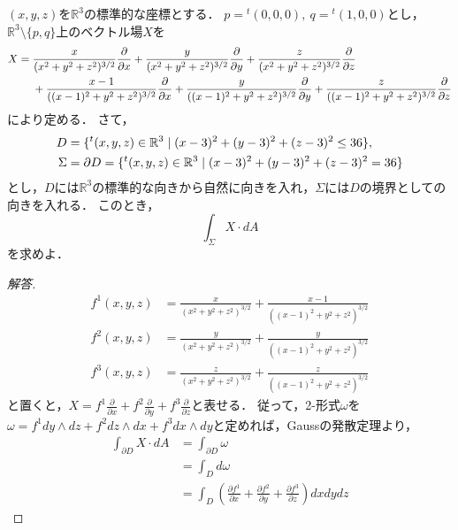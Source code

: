 \documentclass[uplatex, dvipdfmx]{jsreport}
\begin{document}
\begin{example}
    \begin{question*}
        $(x,y,z)$を$\mathbb{R}^3$の標準的な座標とする．
        $p={}^t(0,0,0),\ q={}^t(1,0,0)$とし，$\mathbb{R}^3\setminus\{p,q\}$上のベクトル場$X$を
        \begin{align*}
        X&=\frac{x}{(x^2+y^2+z^2)^{3/2}}\frac{\partial}{\partial x}+\frac{y}{(x^2+y^2+z^2)^{3/2}}\frac{\partial}{\partial y}+\frac{z}{(x^2+y^2+z^2)^{3/2}}\frac{\partial}{\partial z}\\*
        &\hphantom{{}={}}+\frac{x-1}{((x-1)^2+y^2+z^2)^{3/2}}\frac{\partial}{\partial x}+\frac{y}{((x-1)^2+y^2+z^2)^{3/2}}\frac{\partial}{\partial y}+\frac{z}{((x-1)^2+y^2+z^2)^{3/2}}\frac{\partial}{\partial z}
        \end{align*}
        により定める．
        さて，
        \begin{align*}
        D&=\{{}^t(x,y,z)\in\mathbb{R}^3\mid(x-3)^2+(y-3)^2+(z-3)^2\leq36\},\\*
        \Sigma&=\partial D=\{{}^t(x,y,z)\in\mathbb{R}^3\mid(x-3)^2+(y-3)^2+(z-3)^2=36\}
        \end{align*}とし，$D$には$\mathbb{R}^3$の標準的な向きから自然に向きを入れ，$\Sigma$には$D$の境界としての向きを入れる．
        このとき，
        \[ \int_{\Sigma}X\cdot dA \]
        を求めよ．
    \end{question*}
    \begin{proof}[解答]
        \begin{align*}
            f^1(x,y,z) &= \frac{x}{(x^2+y^2+z^2)^{3/2}}+\frac{x-1}{((x-1)^2+y^2+z^2)^{3/2}} \\
            f^2(x,y,z) &= \frac{y}{(x^2+y^2+z^2)^{3/2}}+\frac{y}{((x-1)^2+y^2+z^2)^{3/2}} \\
            f^3(x,y,z) &= \frac{z}{(x^2+y^2+z^2)^{3/2}}+\frac{z}{((x-1)^2+y^2+z^2)^{3/2}} 
        \end{align*}
        と置くと，$X=f^1\frac{\partial}{\partial x}+f^2\frac{\partial}{\partial y}+f^3\frac{\partial}{\partial z}$と表せる．
        従って，2-形式$\omega$を$\omega=f^1dy\wedge dz+f^2dz\wedge dx+f^3dx\wedge dy$と定めれば，Gaussの発散定理より，
        \begin{align*}
            \int_{\partial D}X\cdot dA &= \int_{\partial D}\omega \\
            &= \int_Dd\omega\\
            &= \int_D\left(\frac{\partial f^1}{\partial x}+\frac{\partial f^2}{\partial y}+\frac{\partial f^3}{\partial z}\right)dxdydz 

\end{align*}
\end{proof}
\end{example}
\end{document}
